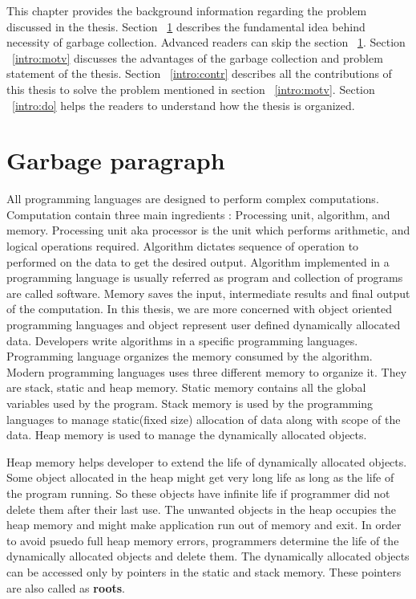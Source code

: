 
This chapter provides the background information regarding the problem discussed in the thesis. Section
~\ref{intro:gc} describes the fundamental idea behind necessity of garbage collection. Advanced readers can skip the section ~\ref{intro:gc}. Section ~\ref{intro:motv} discusses the advantages of the garbage collection and problem statement of the thesis. Section ~\ref{intro:contr} describes all the contributions of this thesis to solve the problem mentioned in section ~\ref{intro:motv}. Section ~\ref{intro:do} helps the readers to understand how the thesis is organized.
\section{Garbage paragraph}
\label{intro:gc}
All programming languages are designed to perform complex computations. Computation contain three main ingredients : Processing unit, algorithm, and memory. Processing unit aka processor is the unit which performs arithmetic, and logical operations required. Algorithm dictates sequence of operation to performed on the data to get the desired output. Algorithm implemented in a programming language is usually referred as program and collection of programs are called software. Memory saves the input, intermediate results and final output of the computation. In this thesis, we are more concerned with object oriented programming languages and object represent user defined dynamically allocated data. Developers write algorithms in a specific programming languages. Programming language organizes the memory consumed by the algorithm. Modern programming languages uses three different memory to organize it. They are stack, static and heap memory. Static memory contains all the global variables used by the program. Stack memory is used by the programming languages to manage static(fixed size) allocation of data along with scope of the data. Heap memory is used to manage the dynamically allocated objects. 

Heap memory helps developer to extend the life of dynamically allocated objects. Some object allocated in the heap might get very long life as long as the life of the program running. So these objects have infinite life if programmer did not delete them after their last use. The unwanted objects in the heap occupies the heap memory and might make application run out of memory and exit. In order to avoid psuedo full heap memory errors, programmers determine the life of the dynamically allocated objects and delete them. The dynamically allocated objects can be accessed only by pointers in the static and stack memory. These pointers are also called as \textbf{roots}.

